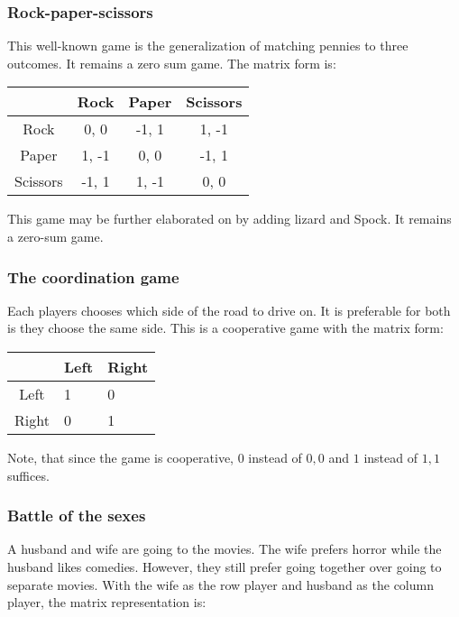 \documentclass[12pt, a4paper]{article}
\begin{document}
\subsubsection{Rock-paper-scissors}
This well-known game is the generalization of matching pennies to three outcomes. It remains a zero sum game. The matrix form is:

\begin{table}[htbp]
\centering
\label{matrix:rock_paper_scissors}
\begin{tabular}{l|c|c|c|}
\cline{2-4}
                               & Rock  & Paper & \multicolumn{1}{l|}{Scissors} \\ \hline
\multicolumn{1}{|c|}{Rock}     & 0, 0  & -1, 1 & 1, -1                         \\ \hline
\multicolumn{1}{|c|}{Paper}    & 1, -1 & 0, 0  & -1, 1                         \\ \hline
\multicolumn{1}{|l|}{Scissors} & -1, 1 & 1, -1 & 0, 0                          \\ \hline
\end{tabular}
\end{table}

This game may be further elaborated on by adding lizard and Spock. It remains a zero-sum game.

\subsubsection{The coordination game}
Each players chooses which side of the road to drive on. It is preferable for both is they choose the same side. This is a cooperative game with the matrix form:

\begin{table}[htbp]
\centering
\label{matrix:coordination_game}
\begin{tabular}{c|l|l|}
\cline{2-3}
\multicolumn{1}{l|}{}   & \multicolumn{1}{c|}{Left} & \multicolumn{1}{c|}{Right} \\ \hline
\multicolumn{1}{|c|}{Left} & 1                  & 0                  \\ \hline
\multicolumn{1}{|c|}{Right} & 0                 & 1                 \\ \hline
\end{tabular}
\end{table}

Note, that since the game is cooperative, $0$ instead of $0, 0$ and $1$ instead of $1, 1$ suffices.

\subsubsection{Battle of the sexes}
A husband and wife are going to the movies. The wife prefers horror while the husband likes comedies. However, they still prefer going together over going to separate movies. With the wife as the row player and husband as the column player, the matrix representation is:
\end{document}
